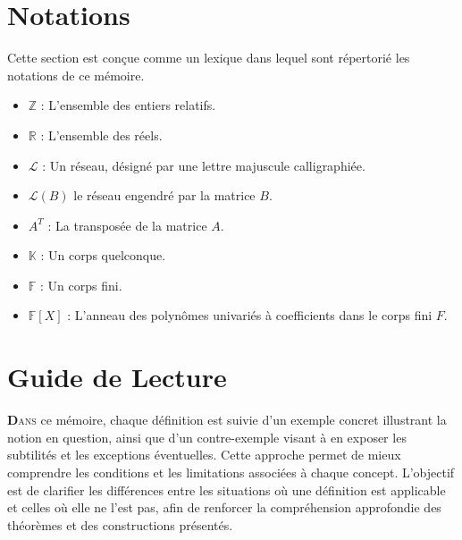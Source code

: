 \documentclass[a4paper,12pt]{report}  %
\theoremstyle{definitionstyle}
\theoremstyle{examplestyle}
\theoremstyle{remarkstyle}
\theoremstyle{propositionstyle}
\theoremstyle{theoremstyle}
\theoremstyle{proofstyle}
\begin{document}
	\tableofcontents %
	
	\renewcommand{\listalgorithmname}{Table des algorithmes}
	\listofalgorithms %
	
	
	\chapter*{Notations}
	
	Cette section est conçue comme un lexique dans lequel sont répertorié les notations de ce mémoire.
	
	\begin{itemize}[label={}]
		\item $\mathbb{Z}$ : L'ensemble des entiers relatifs.
		\item $\mathbb{R}$ : L'ensemble des réels.
		\item $\mathcal{L}$ : Un réseau, désigné par une lettre majuscule calligraphiée.
		\item $\mathcal{L}(B)$ le réseau engendré par la matrice $B$.
		\item $A^T$ : La transposée de la matrice $A$.
		\item $\mathbb{K}$ : Un corps quelconque.
		\item $\mathbb{F}$ : Un corps fini.
		\item $\mathbb{F}[X]$ : L'anneau des polynômes univariés à coefficients dans le corps fini $F$.
	\end{itemize}
	
	
	\chapter*{Guide de Lecture}
	
		\lettrine{\textbf{D}}{ans} ce mémoire, chaque définition est suivie d'un exemple concret illustrant la notion en question, ainsi que d'un contre-exemple visant à en exposer les subtilités et les exceptions éventuelles. Cette approche permet de mieux comprendre les conditions et les limitations associées à chaque concept. L'objectif est de clarifier les différences entre les situations où une définition est applicable et celles où elle ne l'est pas, afin de renforcer la compréhension approfondie des théorèmes et des constructions présentés.
	
\end{document}
